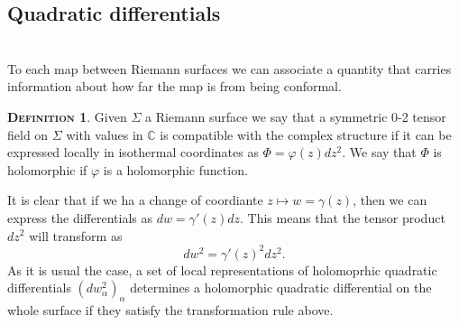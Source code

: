 \documentclass[a4paper,11pt,openright,twoside]{book}
\newcommand{\C}{\mathbb{C}}
\newcommand{\1}{\mathds{1}}
\theoremstyle{plain}
\theoremstyle{definition}
\newtheorem{defn}[thm]{\textsc{Definition}}
\theoremstyle{remark}
\begin{document}
\subsection{Quadratic differentials}\mbox{}\\
To each map between Riemann surfaces we can associate a quantity that carries information about how far the map is from being conformal.
\begin{defn}
	Given $\Sigma$ a Riemann surface we say that a symmetric 0-2 tensor field on $\Sigma$ with values in $\C$ is compatible with the complex structure if it can be expressed locally in isothermal coordinates as $\Phi = \varphi(z)dz^2$. We say that $\Phi$ is holomorphic if $\varphi$ is a holomorphic function.
\end{defn}
It is clear that if we ha a change of coordiante $z \mapsto w = \gamma(z)$, then we can express the differentials as $dw = \gamma'(z)dz$. This means that the tensor product $dz^2$ will transform as 
\[ dw^2 = \gamma'(z)^2 dz^2 .\]
As it is usual the case, a set of local representations of holomoprhic quadratic differentials $(dw_\alpha^2)_\alpha$ determines a holomorphic quadratic differential on the whole surface if they satisfy the transformation rule above.\\
\end{document}
